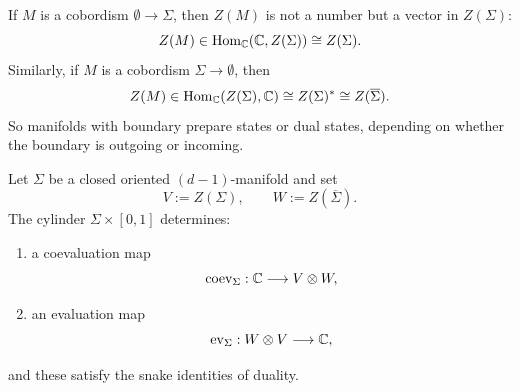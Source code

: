 \begin{remark}\label{rem:one-boundary-component}
If $M$ is a cobordism $\emptyset \to \Sigma$, then $Z(M)$ is not a number but a vector in $Z(\Sigma)$:
\begin{equation*}
Z(M) \in \operatorname{Hom}_{\mathbb{C}}(\mathbb{C}, Z(\Sigma)) \cong Z(\Sigma).
\end{equation*}
Similarly, if $M$ is a cobordism $\Sigma \to \emptyset$, then
\begin{equation*}
Z(M) \in \operatorname{Hom}_{\mathbb{C}}(Z(\Sigma), \mathbb{C}) \cong Z(\Sigma)^* \cong Z(\overline{\Sigma}).
\end{equation*}
So manifolds with boundary prepare states or dual states, depending on whether the boundary is outgoing or incoming.
\end{remark}

\begin{proposition}\label{prop:evaluation-coevaluation}
Let $\Sigma$ be a closed oriented $(d-1)$-manifold and set
\begin{equation*}
V := Z(\Sigma),
\qquad
W := Z(\overline{\Sigma}).
\end{equation*}
The cylinder $\Sigma \times [0,1]$ determines:
\begin{enumerate}
\item a coevaluation map
\begin{equation}\label{eq:coev}
\operatorname{coev}_{\Sigma} : \mathbb{C} \longrightarrow V \otimes W,
\end{equation}
\item an evaluation map
\begin{equation}\label{eq:ev}
\operatorname{ev}_{\Sigma} : W \otimes V \longrightarrow \mathbb{C},
\end{equation}
\end{enumerate}
and these satisfy the snake identities of duality.
\end{proposition}

